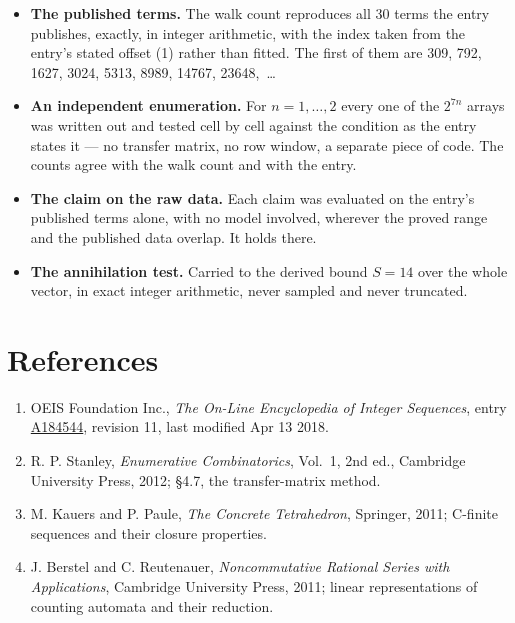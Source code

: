 \documentclass[11pt]{article}
\theoremstyle{definition}
\begin{document}
\begin{itemize}

\item {\bfseries The published terms.} The walk count reproduces all 30 terms the entry publishes, exactly, in integer arithmetic, with the index taken from the entry's stated offset (1) rather than fitted. The first of them are 309, 792, 1627, 3024, 5313, 8989, 14767, 23648,~\dots

\item {\bfseries An independent enumeration.} For $n = 1,\dots,2$ every one of the $2^{7n}$ arrays was written out and tested cell by cell against the condition as the entry states it --- no transfer matrix, no row window, a separate piece of code. The counts agree with the walk count and with the entry.

\item {\bfseries The claim on the raw data.} Each claim was evaluated on the entry's published terms alone, with no model involved, wherever the proved range and the published data overlap. It holds there.

\item {\bfseries The annihilation test.} Carried to the derived bound $S = 14$ over the whole vector, in exact integer arithmetic, never sampled and never truncated.

\end{itemize}

\section{References}

\begin{enumerate}

\item OEIS Foundation Inc., \emph{The On-Line Encyclopedia of Integer Sequences}, entry \href{https://oeis.org/A184544}{A184544}, revision 11, last modified Apr 13 2018.

\item R. P. Stanley, \emph{Enumerative Combinatorics}, Vol.~1, 2nd ed., Cambridge University Press, 2012; \S4.7, the transfer-matrix method.

\item M. Kauers and P. Paule, \emph{The Concrete Tetrahedron}, Springer, 2011; C-finite sequences and their closure properties.

\item J. Berstel and C. Reutenauer, \emph{Noncommutative Rational Series with Applications}, Cambridge University Press, 2011; linear representations of counting automata and their reduction.

\end{enumerate}
\end{document}
